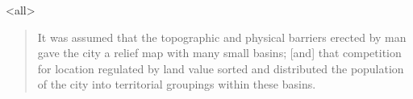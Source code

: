 \mode<all>{
}


\begin{quote}
  It was assumed that the topographic and physical barriers erected by
  man gave the city a relief map with many small basins; [and] that
  competition for location regulated by land value sorted and
  distributed the population of the city into territorial groupings
  within these basins.
\end{quote}

